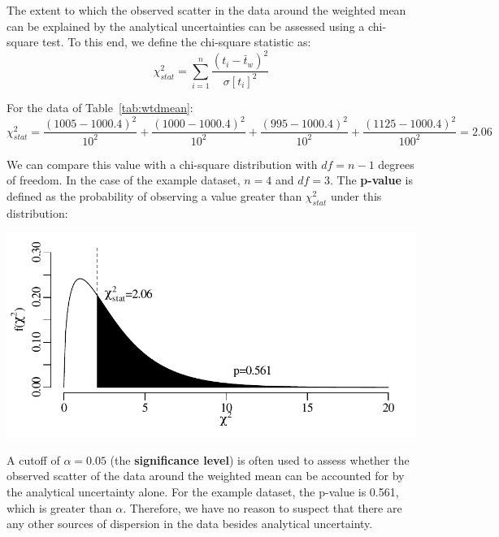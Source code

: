 \begin{refsection}
The extent to which the observed scatter in the data around the
weighted mean can be explained by the analytical uncertainties can be
assessed using a chi-square test.  To this end, we define the
chi-square statistic as:
\begin{equation}
  \chi^2_{stat} = \sum\limits_{i=1}^{n}\frac{(t_i-\bar{t}_w)^2}{\sigma[t_i]^2}
  \label{eq:chi2wtdmean}
\end{equation}

For the data of Table~\ref{tab:wtdmean}:
\[
\chi^2_{stat} = \frac{(1005-1000.4)^2}{10^2}
+ \frac{(1000-1000.4)^2}{10^2}
+ \frac{(995-1000.4)^2}{10^2} +
\frac{(1125-1000.4)^2}{100^2}
= 2.06
\]
  
We can compare this value with a chi-square distribution with $df = n
- 1$ degrees of freedom. In the case of the example dataset, $n=4$ and
$df=3$. The \textbf{p-value} is defined as the probability of
observing a value greater than $\chi_{stat}^2$ under this
distribution:

\noindent\begin{minipage}[t]{.7\textwidth}
\strut\vspace*{-\baselineskip}\newline
\includegraphics[width=\textwidth]{../figures/chi2wtdmean.pdf}
\end{minipage}
\begin{minipage}[t]{.3\textwidth}
  \label{fig:chi2}
\end{minipage}

A cutoff of $\alpha=0.05$ (the \textbf{significance level}) is often
used to assess whether the observed scatter of the data around the
weighted mean can be accounted for by the analytical uncertainty
alone.  For the example dataset, the p-value is 0.561, which is
greater than $\alpha$. Therefore, we have no reason to suspect that
there are any other sources of dispersion in the data besides
analytical uncertainty.\\


\end{refsection}
